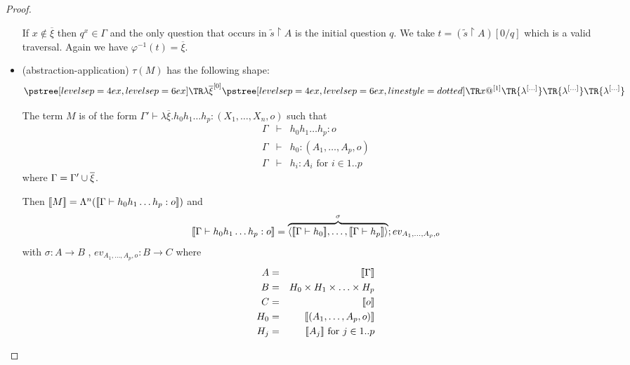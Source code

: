 \begin{proof}
\begin{itemize}
    If $x \not\in \overline{\xi}$ then $q^x \in \Gamma$ and the only question that occurs in $\tilde{s}\upharpoonright A$ is
    the initial question $q$. We take $t = (\tilde{s}\upharpoonright A) [0/q]$ which is a valid traversal.
    Again we have $\varphi^{-1}(t) =  \overline{\xi}$.


        \item (abstraction-application) $\tau(M)$ has the following shape:
         $$ \tree[levelsep=6ex]{ \lambda \overline{\xi}^{[0]}}
        { \tree[levelsep=6ex,linestyle=dotted]{x@^{[1]}}
            {   \TR{\lambda^{[\ldots]}} \TR{\lambda^{[\ldots]}} \TR{\lambda^{[\ldots]}}
            }} $$

        The term $M$ is of the form $\Gamma' \vdash \lambda \overline{\xi} . h_0 h_1 \ldots h_p : (X_1,\ldots, X_n,o)$ such that
        \begin{eqnarray*}
        \Gamma &\vdash& h_0 h_1 \ldots h_p : o \\
        \Gamma &\vdash& h_0 : (A_1,\ldots,A_p,o)\\
        \Gamma &\vdash& h_i : A_i \mbox{ for } i \in 1..p
        \end{eqnarray*}
        where $\Gamma = \Gamma' \cup \overline{\xi}$.

        Then ${[\![ M ]\!]} = \Lambda^n( {[\![ \Gamma \vdash h_0 h_1 \ldots h_p : o ]\!]} )$ and
        $$
            {[\![ \Gamma \vdash h_0 h_1 \ldots h_p : o ]\!]} = \overbrace{\langle {[\![\Gamma \vdash h_0 ]\!]}, \ldots, {[\![ \Gamma \vdash h_p ]\!]} \rangle}^\sigma ; ev_{A_1,\ldots,A_p,o}
            $$
        with $\sigma : A \longrightarrow B$ , $ev_{A_1,\ldots,A_p,o} : B \longrightarrow C$ where
        \begin{eqnarray*}
         A &=& \sem{\Gamma} \\
         B &=& H_0 \times H_1 \times \ldots \times H_p \\
         C &=& \sem{o} \\
         H_0 &=& \sem{(A_1,\ldots,A_p,o)} \\
         H_j &=& \sem{A_j} \mbox{ for }j \in 1..p
        \end{eqnarray*}


\end{itemize}
\end{proof}

